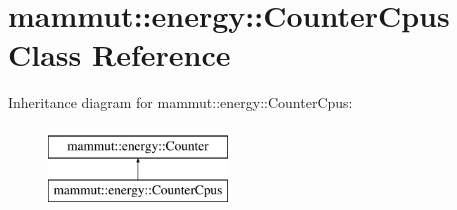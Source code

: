 \hypertarget{classmammut_1_1energy_1_1CounterCpus}{\section{mammut\-:\-:energy\-:\-:Counter\-Cpus Class Reference}
\label{classmammut_1_1energy_1_1CounterCpus}
}
Inheritance diagram for mammut\-:\-:energy\-:\-:Counter\-Cpus\-:\begin{figure}[H]
\begin{center}
\leavevmode
\includegraphics[height=2.000000cm]{classmammut_1_1energy_1_1CounterCpus}
\end{center}
\end{figure}
